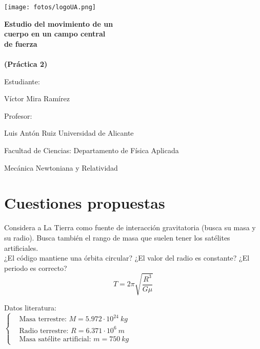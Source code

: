 \documentclass[11pt]{article}
\newcommand{\laputa}[1]{\begin{note}{#1}{}\end{note}}
\newcommand{\titulo}{Estudio del movimiento de un\\ cuerpo en un campo central\\
de fuerza\\\ \\(Práctica 2)}
\newcommand{\nombreestudiante}{Víctor Mira Ramírez}
\newcommand{\nombredirector}{Luis Antón Ruiz}
\newcommand{\fecha}{\date{Diciembre 2023}}
\begin{document}
    \begin{titlepage}
    	\centering
    	\texttt{[image: fotos/logoUA.png]}\par
    	\vspace{1cm}
    	{\huge\bfseries \vspace{15mm} \titulo \par}
    	\vfill
    	{\large 
    	\vfill
    	Estudiante:\par\vspace{2mm}
    	\nombreestudiante\par
    	\vfill
    	Profesor:\par\vspace{2mm}
        \nombredirector
        \vfill
        Universidad de Alicante\par
        Facultad de Ciencias: Departamento de Física Aplicada\par
        Mecánica Newtoniana y Relatividad\par
    	\fecha\par}
    \end{titlepage}
    
    \clearpage

    \begin{abstract}\label{sec:abstract}
        Este informe examina el comportamiento de un cuerpo sometido a un campo central de fuerzas. Se discutirá la interacción gravitatoria terrestre sobre un satélite que orbita al planeta Tierra.
    \end{abstract}\vspace{0.3cm}  
    
    \tableofcontents
    \clearpage
    \section{Cuestiones propuestas}
        \laputa{Considera a La Tierra como fuente de interacción gravitatoria (busca su masa y su radio). Busca también el rango de masa que suelen tener los satélites artificiales.\\
        
        ¿El código mantiene una órbita circular? ¿El valor del radio es constante? ¿El periodo es correcto?         
        \[T=2\pi\sqrt{\dfrac{R^3}{G\mu}}\]}

            \noindent Datos literatura:\\
            
            \vspace{-0.1cm}$\left\{\begin{aligned}
                &\text{Masa terrestre: }M=5.972\cdot10^{24}\ kg\\
                &\text{Radio terrestre: }R=6.371\cdot10^6\ m\\
                &\text{Masa satélite artificial: }m=750\ kg
            \end{aligned}\right.$\\
\end{document}
